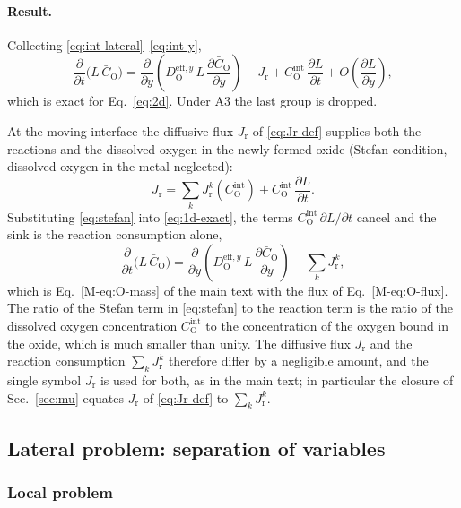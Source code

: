 \documentclass[12pt]{article}
\newcommand{\eff}{\mathrm{eff}}
\newcommand{\intf}{\mathrm{int}}
\newcommand{\Ox}{\mathrm{O}}
\newcommand{\Dy}{D_{\Ox}^{\eff,y}}
\newcommand{\Cb}{\bar{C}_{\Ox}}
\newcommand{\Ci}{C_{\Ox}^{\intf}}
\newcommand{\Jr}{J_{\mathrm{r}}}
\begin{document}
\paragraph{Result.} Collecting \eqref{eq:int-lateral}--\eqref{eq:int-y},
\begin{equation}
\frac{\partial}{\partial t}\bigl(L\,\Cb\bigr)
 =\frac{\partial}{\partial y}\!\left(\Dy\,L\,\frac{\partial\Cb}{\partial y}\right)
  -\Jr
  +\Ci\,\frac{\partial L}{\partial t}
  +O\!\left(\frac{\partial L}{\partial y}\right),
\label{eq:1d-exact}
\end{equation}
which is exact for Eq.~\eqref{eq:2d}. Under A3 the last group is dropped.

At the moving interface the diffusive flux \(\Jr\) of \eqref{eq:Jr-def}
supplies both the reactions and the dissolved oxygen in the newly formed oxide
(Stefan condition, dissolved oxygen in the metal neglected):
\begin{equation}
\Jr=\sum_k\Jr^{k}(\Ci)+\Ci\,\frac{\partial L}{\partial t}.
\label{eq:stefan}
\end{equation}
Substituting \eqref{eq:stefan} into \eqref{eq:1d-exact}, the terms
\(\Ci\,\partial L/\partial t\) cancel and the sink is the reaction consumption
alone,
\begin{equation}
\frac{\partial}{\partial t}\bigl(L\,\Cb\bigr)
 =\frac{\partial}{\partial y}\!\left(\Dy\,L\,\frac{\partial\Cb}{\partial y}\right)
  -\sum_k\Jr^{k},
\label{eq:1d-working}
\end{equation}
which is Eq.~\eqref{M-eq:O-mass} of the main text with the flux of
Eq.~\eqref{M-eq:O-flux}. The ratio of the Stefan term in \eqref{eq:stefan} to
the reaction term is the ratio of the dissolved oxygen concentration \(\Ci\)
to the concentration of the oxygen bound in the oxide, which is much smaller
than unity. The diffusive flux \(\Jr\) and the reaction consumption
\(\sum_k\Jr^{k}\) therefore differ by a negligible amount, and the single
symbol \(\Jr\) is used for both, as in the main text; in particular the
closure of Sec.~\ref{sec:mu} equates \(\Jr\) of \eqref{eq:Jr-def} to
\(\sum_k\Jr^{k}\).

\subsection{Lateral problem: separation of variables}
\label{sec:mode}

\subsubsection{Local problem}
\end{document}
